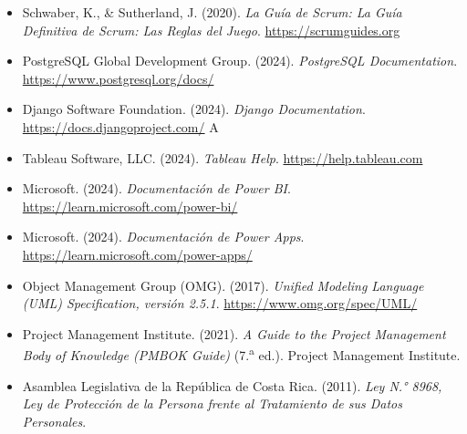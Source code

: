 \documentclass[12pt,letterpaper]{article}
\begin{document}
\begin{itemize}[leftmargin=1.2cm]
    \item Schwaber, K., \& Sutherland, J. (2020). \textit{La Guía de Scrum: La Guía
    Definitiva de Scrum: Las Reglas del Juego}. \url{https://scrumguides.org}

    \item PostgreSQL Global Development Group. (2024). \textit{PostgreSQL Documentation}.
    \url{https://www.postgresql.org/docs/}

    \item Django Software Foundation. (2024). \textit{Django Documentation}.
    \url{https://docs.djangoproject.com/}
A
    \item Tableau Software, LLC. (2024). \textit{Tableau Help}.
    \url{https://help.tableau.com}

    \item Microsoft. (2024). \textit{Documentación de Power BI}.
    \url{https://learn.microsoft.com/power-bi/}

    \item Microsoft. (2024). \textit{Documentación de Power Apps}.
    \url{https://learn.microsoft.com/power-apps/}

    \item Object Management Group (OMG). (2017). \textit{Unified Modeling Language (UML)
    Specification, versión 2.5.1}. \url{https://www.omg.org/spec/UML/}

    \item Project Management Institute. (2021). \textit{A Guide to the Project Management
    Body of Knowledge (PMBOK Guide)} (7.\textsuperscript{a} ed.). Project Management
    Institute.

    \item Asamblea Legislativa de la República de Costa Rica. (2011). \textit{Ley N.°
    8968, Ley de Protección de la Persona frente al Tratamiento de sus Datos Personales}.

    
\end{itemize}
\end{document}
